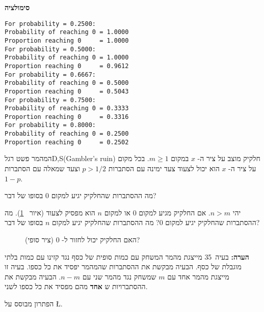 \textbf{סימולציה}
\begin{verbatim}
For probability = 0.2500:
Probability of reaching 0 = 1.0000
Proportion reaching 0     = 1.0000
For probability = 0.5000:
Probability of reaching 0 = 1.0000
Proportion reaching 0     = 0.9612
For probability = 0.6667:
Probability of reaching 0 = 0.5000
Proportion reaching 0     = 0.5043
For probability = 0.7500:
Probability of reaching 0 = 0.3333
Proportion reaching 0     = 0.3316
For probability = 0.8000:
Probability of reaching 0 = 0.2500
Proportion reaching 0     = 0.2502
\end{verbatim}


\begin{prob}{המהמר פשט רגל}{D,S}{(Gambler's ruin)}
חלקיק מוצב על ציר ה-%
$x$
במקום
$m\geq 1$.
בכל מקום על ציר ה-%
$x$
הוא יכול לצעוד צעד ימינה עם הסתברות
$p>1/2$
וצעד שמאלה עם הסתברות
$1-p$.

מה ההסתברות שהחלקיק יגיע למקום
$0$
בסופו של דבר?

 יהי 
$n>m$.
אם החלקיק מגיע למקום 
$0$
או למקום
$n$
הוא מפסיק לצעוד (איור%
~\ref{f.ruin3}).
מה ההסתברות שהחלקיק יגיע למקום 
$0$?
מה ההסתברות שהחלקיק יגיע למקום
$n$
בסופו של דבר?
\begin{figure}[tb]
\begin{center}
\end{center}
\caption{האם החלקיק יכול לחזור ל-%
$0$ (ציר סופי)?}
\label{f.ruin3}
\end{figure}

\textbf{הערה:} 
בעיה~35 מייצגת מהמר המשחק עם כמות סופית של כסף נגד קזינו עם כמות בלתי מוגבלת של כסף. הבעיה מבקשת את ההסתברות שהמהמר יפסיד את כל כספו. בעיה זו מייצגת מהמר אחד עם 
$m$
שמשחק נגד מהמר שני עם 
$n-m$.
הבעיה מבקשת את ההסתברויות ש%
\textbf{אחד}
מהם מפסיד את כל כספו לשני.
\end{prob}
\solution{}

הפתרון מבוסס על
\L{\cite[Chapter~2, Example~4m]{ross}}.

